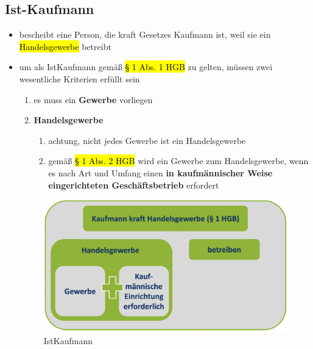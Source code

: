 \documentclass[a4paper, 10pt]{article}
\begin{document}
\subsection{Ist-Kaufmann}
\begin{itemize}
    \item bescheibt eine Person, die kraft Gesetzes Kaufmann ist, weil sie ein \hl{Handelsgewerbe} betreibt
    \item um als IstKaufmann gemäß \hl{§ 1 Abs. 1 HGB} zu gelten, müssen zwei wesentliche Kriterien erfüllt sein
    \begin{enumerate}
        \item es muss ein \textbf{Gewerbe} vorliegen
        \item \textbf{Handelsgewerbe}
        \begin{enumerate}
            \item achtung, nicht jedes Gewerbe ist ein Handelsgewerbe
            \item gemäß \hl{§ 1 Abs. 2 HGB} wird ein Gewerbe zum Handelsgewerbe, wenn es nach Art und Umfang einen \textbf{in kaufmännischer Weise eingerichteten Geschäftsbetrieb} erfordert
        \end{enumerate}
    \end{enumerate}

    \begin{figure}[h]
        \centering
        \includegraphics[width=0.5\linewidth]{Bildschirmfoto 2024-10-30 um 12.28.37.png}
        \caption{IstKaufmann}
        \label{fig:enter-label}
    \end{figure}
\end{itemize}
\end{document}

